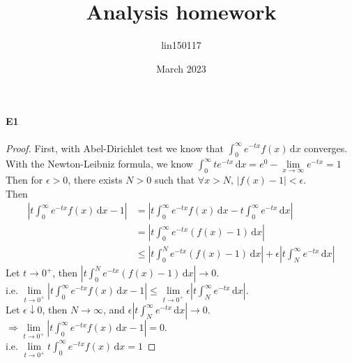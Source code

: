 \documentclass{article}
\title{Analysis homework}
\author{lin150117 }
\date{March 2023}
\begin{document}
\paragraph{E1}
\begin{proof}
    First, with Abel-Dirichlet test we know that  $ \int_{0}^{\infty} e^{-tx}f(x)\, \mathrm{d}x   $ converges.\\
    With the Newton-Leibniz formula, we know $ \int_{0 }^{\infty } te^{-tx}\, \mathrm{d}x =e^0-\lim\limits_{x\to\infty}e^{-tx}=1    $ 
    Then for  $ \epsilon>0 $,  there exists  $ N>0  $ such that  $ \forall x>N  $,  $ |f(x)-1|<\epsilon $.\\
    Then  
    \begin{align*}
        |t\int_{0}^{\infty} e^{-tx}f(x)\, \mathrm{d}x-1|&=|t\int_{0}^{\infty} e^{-tx}f(x)\, \mathrm{d}x-t\int_{0}^{\infty} e^{-tx}\, \mathrm{d}x|\\
        &=|t\int_{0}^{\infty} e^{-tx}(f(x)-1)\, \mathrm{d}x|\\
        & \leqslant |t \int_{0 }^{N } e^{-tx}(f(x)-1)\, \mathrm{d}x|+\epsilon|t \int_{N }^{\infty } e^{-tx}\, \mathrm{d}x|    
    \end{align*}
    Let  $ t\rightarrow0^+ $, then   $ |t \int_{0 }^{N } e^{-tx}(f(x)-1)\, \mathrm{d}x|\rightarrow0 $.\\
    i.e.   $ \lim\limits_{t\to0^+}  |t\int_{0}^{\infty} e^{-tx}f(x)\, \mathrm{d}x-1| \leqslant \lim\limits_{t\to0^+}  \epsilon|t \int_{N }^{\infty } e^{-tx}\, \mathrm{d}x| $.\\
    Let  $ \epsilon\downarrow0 $, then  $ N\rightarrow\infty $, and  $ \epsilon|t \int_{N }^{\infty } e^{-tx}\, \mathrm{d}x|\rightarrow0 $.\\
     $ \Rightarrow \lim\limits_{t\to0^+}  |t\int_{0}^{\infty} e^{-tx}f(x)\, \mathrm{d}x-1|=0 $.\\
     i.e. $ \lim\limits_{t\to0^+}t \int_{0 }^{\infty } e^{-tx}f(x)\, \mathrm{d}x=1  $        
\end{proof}
\end{document}

